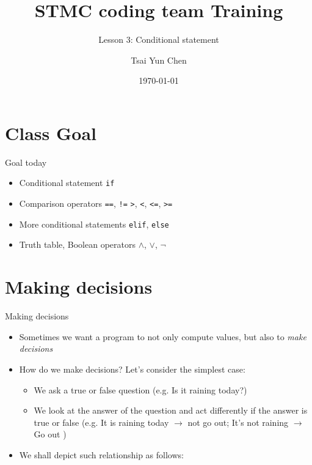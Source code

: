 \documentclass[10pt,xcolor={table,dvipsnames},t]{beamer}
\title[Your Short Title]{STMC coding team Training}
\subtitle{Lesson 3: Conditional statement}
\author{Tsai Yun Chen}
\date{\today}
\begin{document}
\begin{frame}
  \titlepage
\end{frame}


\section{Class Goal}

\begin{frame}{Goal today}

\begin{itemize}
  \item Conditional statement \texttt{if}
  \item Comparison operators \texttt{==}, \texttt{!=} \texttt{>}, \texttt{<}, \texttt{<=}, \texttt{>=}
  \item More conditional statements \texttt{elif}, \texttt{else}
  \item Truth table, Boolean operators $\land$, $\lor$, $\neg$
\end{itemize}

\end{frame}


\section{Making decisions}
\begin{frame}{Making decisions}
    \begin{itemize}
      \item Sometimes we want a program to not only compute values, but also to \textit{make decisions}
      \vspace{2mm}
      \item How do we make decisions? Let's consider the simplest case:
      \begin{itemize}
        \item We ask a true or false question (e.g. Is it raining today?)
        \item We look at the answer of the question and act differently if the answer is true or false (e.g. It is raining today $\rightarrow$ not go out; It's not raining  $\rightarrow$ Go out )
      \end{itemize}
      \item We shall depict such relationship as follows:
    \end{itemize}
\end{frame}
\end{document}

